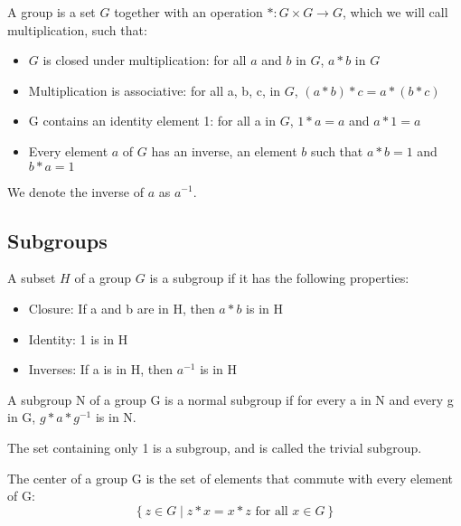 \documentclass[runningheads,a4paper]{llncs}
\renewcommand{\-}{\setminus}
\begin{document}
\begin{definition}[Group] 
A group is a set $G$ together with an operation $* : G \times G \to G$, which we will call multiplication, such that:
\begin{itemize}
\item $G$ is closed under multiplication: for all $a$ and $b$ in $G$, $a*b$ in $G$
\item Multiplication is associative: for all a, b, c, in $G$, $(a*b)*c = a*(b*c)$
\item G contains an identity element 1: for all a in $G$, $1*a = a$ and $a*1=a$
\item Every element $a$ of $G$ has an inverse, an element $b$ such that $a*b = 1$ and $b*a =1$
\end{itemize}

We denote the inverse of $a$ as $a^{-1}$.
\end{definition}

\subsection{Subgroups}

\begin{definition}[Subgroup]
A subset $H$ of a group $G$ is a subgroup if it has the following properties:
\begin{itemize}
\item Closure: If a and b are in H, then $a * b$ is in H
\item Identity: 1 is in H
\item Inverses: If a is in H, then $a^{-1}$ is in H
\end{itemize}
\end{definition}

\begin{definition}[Normal]
A subgroup N of a group G is a normal subgroup if for every a in N and every g in G, $g * a * g^{-1}$ is in N.
\end{definition}

\begin{definition} The set containing only 1 is a subgroup, and is called the trivial subgroup.
\end{definition}

\begin{definition}[Center]
The center of a group G is the set of elements that commute with every element of G:
\[
\left\{ z \in G \mid z*x = x*z \text{ for all } x \in G \right\}
\]
\end{definition}
\end{document}
